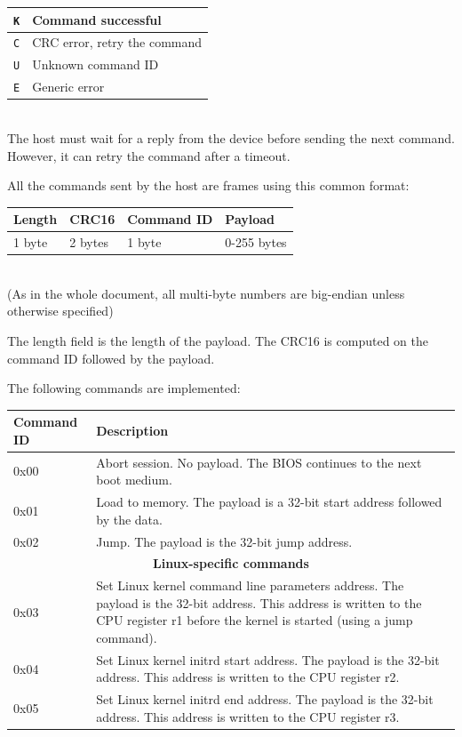 \documentclass[a4paper,11pt]{article}
\begin{document}
\begin{tabular}{|l|l|}
\hline
\verb!K! & Command successful \\
\hline
\verb!C! & CRC error, retry the command \\
\hline
\verb!U! & Unknown command ID \\
\hline
\verb!E! & Generic error \\
\hline
\end{tabular}\\

The host must wait for a reply from the device before sending the next command. However, it can retry the command after a timeout.

All the commands sent by the host are frames using this common format:\\

\begin{tabular}{|l|l|l|l|}
\hline
\textbf{Length} & \textbf{CRC16} & \textbf{Command ID} & \textbf{Payload} \\
\hline
1 byte & 2 bytes & 1 byte & 0-255 bytes \\
\hline
\end{tabular}\\

(As in the whole document, all multi-byte numbers are big-endian unless otherwise specified)

The length field is the length of the payload. The CRC16 is computed on the command ID followed by the payload.

The following commands are implemented:\\

\begin{tabularx}{\textwidth}{|l|X|}
\hline
\textbf{Command ID} & \textbf{Description} \\
\hline
0x00 & Abort session. No payload. The BIOS continues to the next boot medium. \\
\hline
0x01 & Load to memory. The payload is a 32-bit start address followed by the data. \\
\hline
0x02 & Jump. The payload is the 32-bit jump address. \\
\hline
\multicolumn{2}{|c|}{\textbf{Linux-specific commands}} \\
\hline
0x03 & Set Linux kernel command line parameters address. The payload is the 32-bit address. This address is written to the CPU register r1 before the kernel is started (using a jump command). \\
\hline
0x04 & Set Linux kernel initrd start address. The payload is the 32-bit address. This address is written to the CPU register r2. \\
\hline
0x05 & Set Linux kernel initrd end address. The payload is the 32-bit address. This address is written to the CPU register r3. \\
\hline
\end{tabularx}
\end{document}
